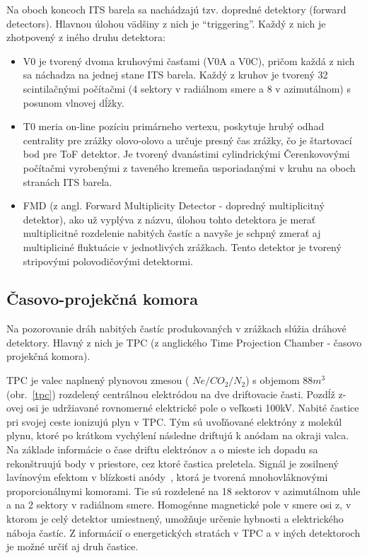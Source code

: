 \documentclass[thesismargins, thesislinespacing]{rnthesis}
\begin{document}
Na oboch koncoch ITS barela sa nachádzajú tzv. dopredné detektory (forward detectors). Hlavnou úlohou vädšiny z nich je “triggering”. Každý z nich je zhotpovený z iného druhu detektora:
\begin{itemize}
	\item V0 je tvorený dvoma kruhovými časťami (V0A a V0C), pričom každá z nich sa náchadza na jednej stane ITS barela. Každý z kruhov je tvorený 32 scintilačnými počítačmi (4 sektory v radiálnom smere a 8 v azimutálnom) s posunom vlnovej dĺžky. 
	\item T0 meria on-line pozíciu primárneho vertexu, poskytuje hrubý odhad centrality pre zrážky olovo-olovo a určuje presný čas zrážky, čo je štartovací bod pre ToF detektor. Je tvorený dvanástimi cylindrickými Čerenkovovými počítačmi vyrobenými z taveného kremeňa usporiadanými v kruhu na oboch stranách ITS barela.
	\item FMD (z angl. Forward Multiplicity Detector - dopredný multiplicitný detektor), ako už vyplýva z názvu, úlohou tohto detektora je merať multiplicitné rozdelenie nabitých častíc a navyše je schpný zmerať aj multipliciné fluktuácie v jednotlivých zrážkach. Tento detektor je tvorený stripovými polovodičovými detektormi.	 
\end{itemize}

\subsection{Časovo-projekčná komora}
\label{textTPC}
Na pozorovanie dráh nabitých častíc produkovaných v zrážkach slúžia dráhové detektory. Hlavný z nich je TPC (z anglického Time Projection Chamber - časovo projekčná komora).

TPC je valec naplnený plynovou zmesou ( $Ne/CO_2/N_2$) s objemom $88m^3$ (obr.~\ref{tpc}) rozdelený centrálnou elektródou na dve driftovacie časti. Pozdĺž z-ovej osi je udržiavané rovnomerné elektrické pole o veľkosti 100kV. Nabité častice pri svojej ceste ionizujú plyn v TPC. Tým sú uvoľňované elektróny z molekúl plynu, ktoré po krátkom vychýlení následne driftujú k anódam na okraji valca. Na základe informácie o čase driftu elektrónov a o mieste ich dopadu sa rekonštruujú body v priestore, cez ktoré častica preletela. Signál je zosilnený lavínovým efektom v blízkosti anódy~\cite{alice1}, ktorá je tvorená mnohovláknovými proporcionálnymi komorami. Tie sú rozdelené na 18 sektorov v azimutálnom uhle a na 2 sektory v radiálnom smere. Homogénne magnetické pole v smere osi z, v ktorom je celý detektor umiestnený, umožňuje určenie hybnosti a elektrického náboja častíc. Z informácií o energetických stratách v TPC a v iných detektoroch je možné určiť aj druh častice. 
\end{document}
